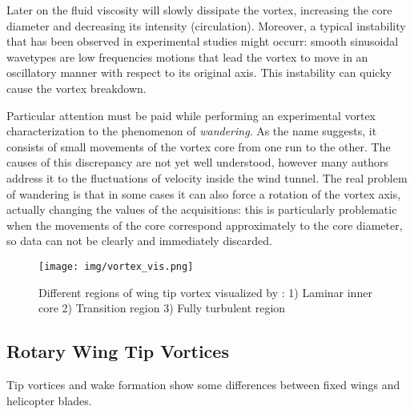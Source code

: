 Later on the fluid viscosity will slowly dissipate the vortex, increasing the core diameter and decreasing its intensity (circulation). Moreover, a typical instability that has been observed in experimental studies might occurr: smooth sinusoidal wavetypes are low frequencies motions that lead the vortex to move in an oscillatory manner with respect to its original axis. This instability can quicky cause the vortex breakdown.

Particular attention must be paid while performing an experimental vortex characterization to the phenomenon of \textit{wandering}. As the name suggests, it consists of small movements of the vortex core from one run to the other. The causes of this discrepancy are not yet well understood, however many authors address it to the fluctuations of velocity inside the wind tunnel. The real problem of wandering is that in some cases it can also force a rotation of the vortex axis, actually changing the values of the acquisitions: this is particularly problematic when the movements of the core correspond approximately to the core diameter, so data can not be clearly and immediately discarded. 

\begin{figure}
	\centering
	\texttt{[image: img/vortex\_vis.png]}
	\caption{Different regions of wing tip vortex visualized by \textcite{Johnson10}: 1) Laminar inner core 2) Transition region 3) Fully turbulent region}
	\label{vortex_vis}
\end{figure}


		

\subsection{Rotary Wing Tip Vortices}

Tip vortices and wake formation show some differences between fixed wings and helicopter blades. 


